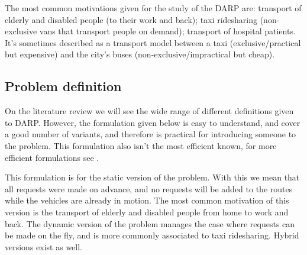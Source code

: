 \documentclass[english,plano-doutorado,twoside]{iiufrgs}
\begin{document}
The most common motivations given for the study of the DARP are: transport of elderly and disabled people (to their work and back); taxi ridesharing (non-exclusive vans that transport people on demand); transport of hospital patients. It's sometimes described as a transport model between a taxi (exclusive/practical but expensive) and the city's buses (non-exclusive/impractical but cheap)\cite{dial_autonomous_1995}.

\subsection{Problem definition}
\label{sec:problem_def}

On the literature review we will see the wide range of different definitions given to DARP. However, the formulation given below is easy to understand, and cover a good number of variants, and therefore is practical for introducing someone to the problem. This formulation also isn't the most efficient known, for more efficient formulations see \cite{ropke_models_2007}.

This formulation is for the static version of the problem. With this we mean that all requests were made on advance, and no requests will be added to the routes while the vehicles are already in motion. The most common motivation of this version is the transport of elderly and disabled people from home to work and back. The dynamic version of the problem manages the case where requests can be made on the fly, and is more commonly associated to taxi ridesharing. Hybrid versions exist as well.
\end{document}
